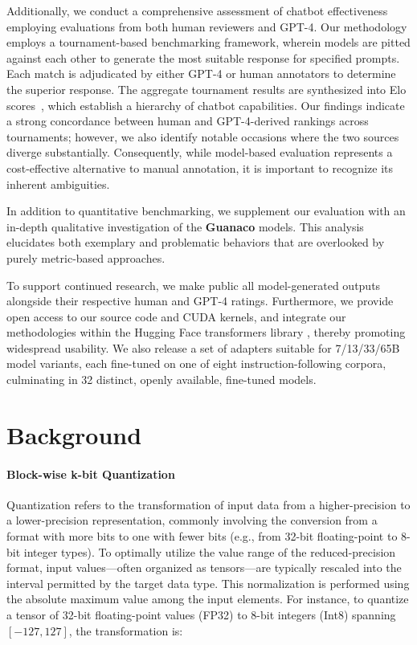 Additionally, we conduct a comprehensive assessment of chatbot effectiveness employing evaluations from both human reviewers and GPT-4. Our methodology employs a tournament-based benchmarking framework, wherein models are pitted against each other to generate the most suitable response for specified prompts. Each match is adjudicated by either GPT-4 or human annotators to determine the superior response. The aggregate tournament results are synthesized into Elo scores~\citep{elo1967proposed, elo1978rating}, which establish a hierarchy of chatbot capabilities. Our findings indicate a strong concordance between human and GPT-4-derived rankings across tournaments; however, we also identify notable occasions where the two sources diverge substantially. Consequently, while model-based evaluation represents a cost-effective alternative to manual annotation, it is important to recognize its inherent ambiguities.

In addition to quantitative benchmarking, we supplement our evaluation with an in-depth qualitative investigation of the \textbf{Guanaco} models. This analysis elucidates both exemplary and problematic behaviors that are overlooked by purely metric-based approaches.

To support continued research, we make public all model-generated outputs alongside their respective human and GPT-4 ratings. Furthermore, we provide open access to our source code and CUDA kernels, and integrate our methodologies within the Hugging Face transformers library \citep{wolf2019huggingface}, thereby promoting widespread usability. We also release a set of adapters suitable for 7/13/33/65B model variants, each fine-tuned on one of eight instruction-following corpora, culminating in 32 distinct, openly available, fine-tuned models.

\section{Background}
\paragraph{Block-wise k-bit Quantization} Quantization refers to the transformation of input data from a higher-precision to a lower-precision representation, commonly involving the conversion from a format with more bits to one with fewer bits (e.g., from 32-bit floating-point to 8-bit integer types). To optimally utilize the value range of the reduced-precision format, input values—often organized as tensors—are typically rescaled into the interval permitted by the target data type. This normalization is performed using the absolute maximum value among the input elements. For instance, to quantize a tensor of 32-bit floating-point values (FP32) to 8-bit integers (Int8) spanning $[-127, 127]$, the transformation is:

